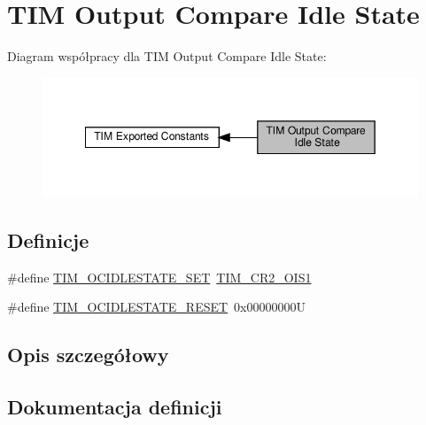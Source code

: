 \hypertarget{group___t_i_m___output___compare___idle___state}{}\section{T\+IM Output Compare Idle State}
\label{group___t_i_m___output___compare___idle___state}
Diagram współpracy dla T\+IM Output Compare Idle State\+:\nopagebreak
\begin{figure}[H]
\begin{center}
\leavevmode
\includegraphics[width=349pt]{group___t_i_m___output___compare___idle___state}
\end{center}
\end{figure}
\subsection*{Definicje}
\begin{DoxyCompactItemize}
\item 
\#define \hyperlink{group___t_i_m___output___compare___idle___state_gad251b83b0e33ddd0ed2fb35aa747ef78}{T\+I\+M\+\_\+\+O\+C\+I\+D\+L\+E\+S\+T\+A\+T\+E\+\_\+\+S\+ET}~\hyperlink{group___peripheral___registers___bits___definition_ga31b26bf058f88d771c33aff85ec89358}{T\+I\+M\+\_\+\+C\+R2\+\_\+\+O\+I\+S1}
\item 
\#define \hyperlink{group___t_i_m___output___compare___idle___state_ga56505fe4142096454f1da97683ce8bc2}{T\+I\+M\+\_\+\+O\+C\+I\+D\+L\+E\+S\+T\+A\+T\+E\+\_\+\+R\+E\+S\+ET}~0x00000000U
\end{DoxyCompactItemize}


\subsection{Opis szczegółowy}


\subsection{Dokumentacja definicji}
\mbox{\label{group___t_i_m___output___compare___idle___state_ga56505fe4142096454f1da97683ce8bc2}} 
